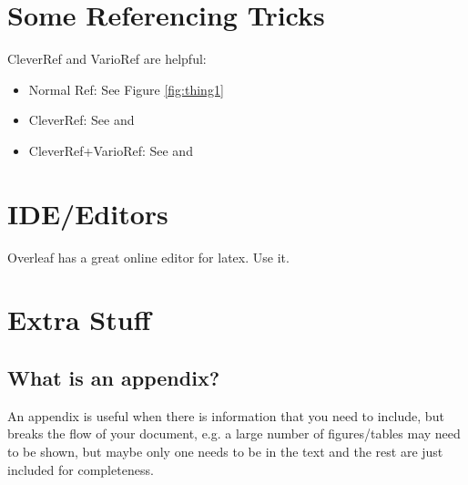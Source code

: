\documentclass[a4paper,twoside,12pt]{report}
\begin{document}
\chapter{Some Referencing Tricks}
CleverRef and VarioRef are helpful:
\begin{itemize}
	\item Normal Ref: See Figure \ref{fig:thing1}
	\item CleverRef: See  and 
	\item CleverRef+VarioRef: See  and 
\end{itemize}

\chapter{IDE/Editors}
Overleaf has a great online editor for latex. Use it. 

\appendix
\chapter{Extra Stuff}\label{app:extra}
\section{What is an appendix?}\label{app:whatis}

An appendix is useful when there is information that you need to include, but breaks the flow of your document, e.g. a large number of figures/tables may need to be shown, but maybe only one needs to be in the text and the rest are just included for completeness.

\nocite{*}

\end{document}
